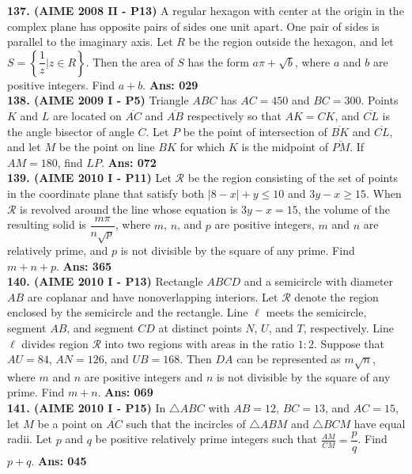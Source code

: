\documentclass[letterpaper,10pt,addpoints]{exam}
\begin{document}
\textbf{137. (AIME 2008 II - P13) }   A regular hexagon with center at the origin in the complex plane has opposite pairs of sides one unit apart. One pair of sides is parallel to the imaginary axis. Let $R$ be the region outside the hexagon, and let $S = \left\lbrace\dfrac{1}{z}|z \in R\right\rbrace$. Then the area of $S$ has the form $a\pi + \sqrt{b}$, where $a$ and $b$ are positive integers. Find $a + b$.  \quad\textbf{Ans: 029}\\

\textbf{138. (AIME 2009 I - P5) }   Triangle $ABC$ has $AC = 450$ and $BC = 300$. Points $K$ and $L$ are located on $\overline{AC}$ and $\overline{AB}$ respectively so that $AK = CK$, and $\overline{CL}$ is the angle bisector of angle $C$. Let $P$ be the point of intersection of $\overline{BK}$ and $\overline{CL}$, and let $M$ be the point on line $BK$ for which $K$ is the midpoint of $\overline{PM}$. If  $AM = 180$, find $LP$.  \quad\textbf{Ans: 072}\\


\textbf{139. (AIME 2010 I - P11) }   Let $\mathcal{R}$ be the region consisting of the set of points in the coordinate plane that satisfy both $|8 - x| + y \le 10$ and $3y - x \ge 15$. When $\mathcal{R}$ is revolved around the line whose equation is $3y - x = 15$, the volume of the resulting solid is $\dfrac {m\pi}{n\sqrt {p}}$, where $m$, $n$, and $p$ are positive integers, $m$ and $n$ are relatively prime, and $p$ is not divisible by the square of any prime. Find $m + n + p$.  \quad\textbf{Ans: 365}\\


\textbf{140. (AIME 2010 I - P13) }   Rectangle $ABCD$ and a semicircle with diameter $AB$ are coplanar and have nonoverlapping interiors. Let $\mathcal{R}$ denote the region enclosed by the semicircle and the rectangle. Line $\ell$ meets the semicircle, segment $AB$, and segment $CD$ at distinct points $N$, $U$, and $T$, respectively. Line $\ell$ divides region $\mathcal{R}$ into two regions with areas in the ratio $1: 2$. Suppose that $AU = 84$, $AN = 126$, and $UB = 168$. Then $DA$ can be represented as $m\sqrt {n}$, where $m$ and $n$ are positive integers and $n$ is not divisible by the square of any prime. Find $m + n$.  \quad\textbf{Ans: 069}\\


\textbf{141. (AIME 2010 I - P15) }   In $\triangle{ABC}$ with $AB = 12$, $BC = 13$, and $AC = 15$, let $M$ be a point on $\overline{AC}$ such that the incircles of $\triangle{ABM}$ and $\triangle{BCM}$ have equal radii. Let $p$ and $q$ be positive relatively prime integers such that $\frac {AM}{CM} = \dfrac {p}{q}$. Find $p + q$.  \quad\textbf{Ans: 045}\\
\end{document}
